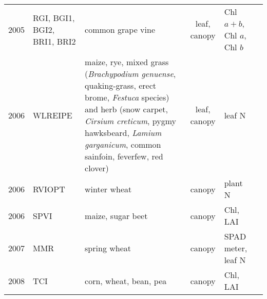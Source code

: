 \documentclass[10pt]{article}
\begin{document}
{\begin{ThreePartTable}
\begin{longtable}{c M{1.5in} M{2.5in} c M{1.5in} M{1.5in}}
  2005 & RGI, BGI1, BGI2, BRI1, BRI2                     & common grape vine                                                                                                                                                                                                                                     & leaf, canopy & Chl $a+b$, Chl $a$, Chl $b$                                                              & \citet{Zarco-Tejada2005}                            \\
  2006 & WLREIPE                                         & maize, rye, mixed grass (\textit{Brachypodium genuense}, quaking-grass, erect brome, \textit{Festuca} species) and herb (snow carpet, \textit{Cirsium creticum}, pygmy hawksbeard, \textit{Lamium garganicum}, common sainfoin, feverfew, red clover) & leaf, canopy & leaf N                                                                                   & \citet{Cho2006}                                     \\
  2006 & RVIOPT                                          & winter wheat                                                                                                                                                                                                                                          & canopy       & plant N                                                                                  & \citet{Reyniers2006}                                \\
  2006 & SPVI                                            & maize, sugar beet                                                                                                                                                                                                                                     & canopy       & Chl, LAI                                                                                 & \citet{Vincini2006}                                 \\
  2007 & MMR                                             & spring wheat                                                                                                                                                                                                                                          & canopy       & SPAD meter, leaf N                                                                       & \citet{Eitel2007}                                   \\
  2008 & TCI                                             & corn, wheat, bean, pea                                                                                                                                                                                                                                & canopy       & Chl, LAI                                                                                 & \citet{Haboudane2008}                               \\

\end{longtable}
\end{ThreePartTable}}
\end{document}
